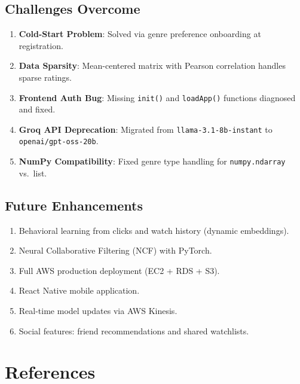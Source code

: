 \documentclass[12pt,a4paper]{report}
\begin{document}
\section{Challenges Overcome}

\begin{enumerate}
    \item \textbf{Cold-Start Problem}: Solved via genre preference onboarding at registration.
    \item \textbf{Data Sparsity}: Mean-centered matrix with Pearson correlation handles sparse ratings.
    \item \textbf{Frontend Auth Bug}: Missing \texttt{init()} and \texttt{loadApp()} functions diagnosed and fixed.
    \item \textbf{Groq API Deprecation}: Migrated from \texttt{llama-3.1-8b-instant} to \texttt{openai/gpt-oss-20b}.
    \item \textbf{NumPy Compatibility}: Fixed genre type handling for \texttt{numpy.ndarray} vs.\ list.
\end{enumerate}

\section{Future Enhancements}

\begin{enumerate}
    \item Behavioral learning from clicks and watch history (dynamic embeddings).
    \item Neural Collaborative Filtering (NCF) with PyTorch.
    \item Full AWS production deployment (EC2 + RDS + S3).
    \item React Native mobile application.
    \item Real-time model updates via AWS Kinesis.
    \item Social features: friend recommendations and shared watchlists.
\end{enumerate}

\chapter*{References}
\end{document}
